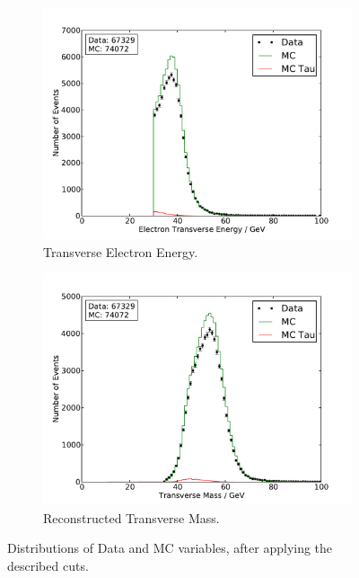 \documentclass[
	paper=A4,
	parskip=full,
	chapterprefix=true,
	11pt,
	headings=normal,
	bibliography=totoc,
	listof=totoc,
	titlepage=on,
]{scrreprt}
\begin{document}
\begin{figure}%
	\centering
	\begin{subfigure}{0.45\textwidth}
		\includegraphics{allcuts/E_T_el}
		\caption{Transverse Electron Energy.}
	\end{subfigure}
	\begin{subfigure}{0.45\textwidth}
		\includegraphics{allcuts/m_T}
		\caption{Reconstructed Transverse Mass.}
	\end{subfigure}
	\caption{Distributions of Data and MC variables, after applying the described cuts.}
	\label{fig:cuts_EtMt}
\end{figure}




\cleardoublepage


{}
\end{document}
